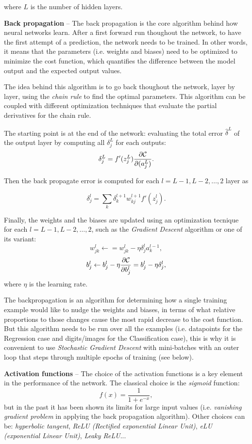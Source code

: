 \documentclass[english,notitlepage,reprint,nofootinbib]{revtex4-1}  %
\begin{document}
where $L$ is the number of hidden layers.

\textbf{Back propagation} – 
The back propagation is the core algorithm behind how neural networks learn. After a first forward run thoughout the network, to have the first attempt of a prediction, the network needs to be trained. In other words, it means that the parameters (i.e. weights and biases) need to be optimized to minimize the cost function, which quantifies the difference between the model output and the expected output values.

The idea behind this algorithm is to go back thoughout the network, layer by layer, using the \textit{chain rule} to find the optimal parameters. This algorithm can be coupled with different optimization techniques that evaluate the partial derivatives for the chain rule.

The starting point is at the end of the network: evaluating the total error $\hat{\delta}^L$ of the output layer by computing all $\delta_j^L$ for each outputs:
$$
\delta_j^L = f'(z_j^L)\frac{\partial {\cal C}}{\partial (a_j^L)}.
$$

Then the back propagate error is computed for each $l=L-1,L-2,\dots,2$ layer as

$$
\delta_j^l = \sum_k \delta_k^{l+1}w_{kj}^{l+1}f'(z_j^l).
$$

Finally, the weights and the biases are updated using an optimization tecnique for each $l=L-1,L-2,\dots,2$, such as the \textit{Gradient Descent} algorithm or one of its variant:
$$
w_{jk}^l\leftarrow  = w_{jk}^l- \eta \delta_j^la_k^{l-1},
$$
$$
b_j^l \leftarrow b_j^l-\eta \frac{\partial {\cal C}}{\partial b_j^l}=b_j^l-\eta \delta_j^l,
$$
where $\eta$ is the learning rate.

The backpropagation is an algorithm for determining how a single training example would like to nudge the weights and biases, in terms of what relative proportions to those changes cause the most rapid decrease to the cost function. But this algorithm needs to be run over all the examples (i.e. datapoints for the Regression case and digits/images for the Classification case), this is why it is convenient to use \textit{Stochastic Gradient Descent} with mini-batches with an outer loop that steps through multiple epochs of training (see below).

\textbf{Activation functions} – 
The choice of the activation functions is a key element in the performance of the network. The classical choice is the \textit{sigmoid} function:
$$
f(x) = \frac{1}{1 + e^{-x}},
$$
but in the past it has been shown its limits for large input values (i.e. \textit{vanishing gradient problem} in applying the back propagation algorithm). Other choices can be: \textit{hyperbolic tangent}, \textit{ReLU (Rectified exponential Linear Unit)}, \textit{eLU (exponential Linear Unit)}, \textit{Leaky ReLU}...
\end{document}
